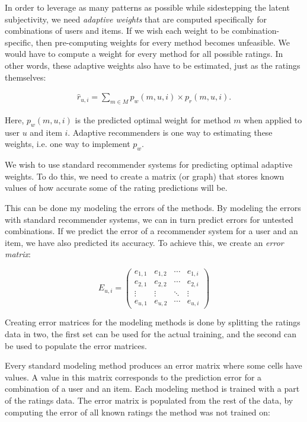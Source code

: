 In order to leverage as many patterns as possible while sidestepping the latent subjectivity,
we need \emph{adaptive weights} that are computed specifically for combinations of users and items.
If we wish each weight to be combination-specific, then pre-computing weights for every method becomes unfeasible.
We would have to compute a weight for every method for all possible ratings.
In other words, these adaptive weights also have to be estimated, just as the ratings themselves:

\begin{eqnarray}
  \hat{r}_{u,i} = \sum_{m \in M} p_{w}(m,u,i) \times p_{r}(m,u,i).
\end{eqnarray}

Here, $p_w(m,u,i)$ is the predicted optimal weight for method $m$ when applied to user $u$ and item $i$.
Adaptive recommenders is one way to estimating these weights, i.e. one way to implement $p_w$.

We wish to use standard recommender systems for predicting optimal adaptive weights.
To do this, we need to create a matrix (or graph)
that stores known values of how accurate some of the rating predictions will be.

This can be done my modeling the errors of the methods.
By modeling the errors with standard recommender systems,
we can in turn predict errors for untested combinations.
If we predict the error of a recommender system for a user and an item,
we have also predicted its accuracy.
To achieve this, we create an \emph{error matrix}:

\begin{equation}
 E_{u,i} =
 \begin{pmatrix}
    e_{1,1} & e_{1,2} & \cdots & e_{1,i} \\
    e_{2,1} & e_{2,2} & \cdots & e_{2,i} \\
    \vdots  & \vdots  & \ddots & \vdots  \\
    e_{u,1} & e_{u,2} & \cdots & e_{u,i}
 \end{pmatrix}
\end{equation}

Creating error matrices for the modeling methods is done by splitting the ratings data in two,
the first set can be used for the actual training, and the second
can be used to populate the error matrices.

Every standard modeling method produces an error matrix where some cells have values.
A value in this matrix corresponds to the prediction error for a combination of a user and an item.
Each modeling method is trained with a part of the ratings data.
The error matrix is populated from the rest of the data,
by computing the error of all known ratings the method was not trained on:

